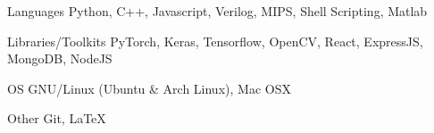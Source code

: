 

\begin{cvskills}

  \cvskill
    {Languages} %
    {Python, C++, Javascript, Verilog, MIPS, Shell Scripting, Matlab} %

  \cvskill
    {Libraries/Toolkits} %
    {PyTorch, Keras, Tensorflow, OpenCV, React, ExpressJS, MongoDB, NodeJS} %

  \cvskill
    {OS} %
    {GNU/Linux (Ubuntu \& Arch Linux), Mac OSX} %

  \cvskill
    {Other} %
    {Git, {\selectfont \LaTeX}} %
\end{cvskills}
